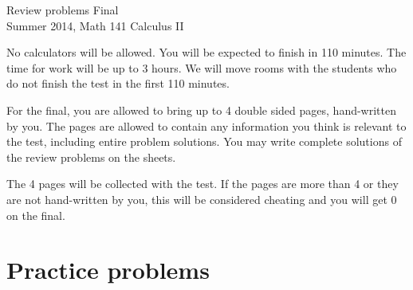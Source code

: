 \documentclass{article}
\begin{document}
\begin{center}
\Large
Review problems Final\\ Summer 2014, Math 141 Calculus II \\
\end{center}


\noindent No calculators will be allowed. You will be expected to finish in 110 minutes. The time for work will be up to 3 hours. We will move rooms with the students who do not finish the test in the first 110 minutes.

For the final, you are allowed to bring up to 4 double sided pages, hand-written by you. The pages are allowed to contain any information you think is relevant to the test, including entire problem solutions. You may write complete solutions of the review problems on the sheets.

The 4 pages will be collected with the test. If the pages are more than 4 or they are not hand-written by you, this will be considered cheating and you will get 0 on the final. 
\section{Practice problems}
\end{document}
